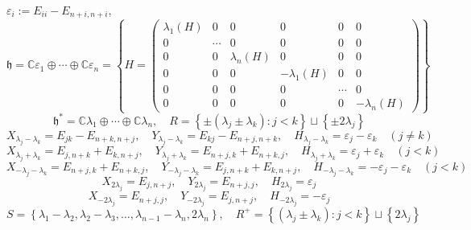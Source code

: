 \documentclass[reqno]{amsart} 
\def\eps{\varepsilon}
\begin{document}
$\eps_i := E_{i i} - E_{n+i,n+i}$,
\begin{equation*}
  \mathfrak{h} = \mathbb{C} \eps_1 \oplus \dotsb \oplus \mathbb{C} \eps_n = \left\{ H = 
\begin{pmatrix}
    \lambda_1(H) & 0 & 0 & 0 & 0 & 0 \\
    0 & \dotsb & 0 & 0 & 0 & 0 \\
    0 & 0 & \lambda_n(H) & 0 & 0 & 0 \\
    0 & 0 & 0 & -\lambda_1(H) & 0 & 0\\
    0 & 0 & 0 & 0 & \dotsb & 0 \\
    0 & 0 & 0 & 0 & 0 & -\lambda_n(H)
  \end{pmatrix}
\right\}
\end{equation*}
\begin{equation*}
  \mathfrak{h}^* = \mathbb{C} \lambda_1 \oplus \dotsb \oplus \mathbb{C} \lambda_n, \quad R = \left\{ \pm (\lambda_j \pm \lambda_k) : j < k \right\} \sqcup \left\{ \pm 2 \lambda_j \right\}
\end{equation*}
\begin{equation*}
  X_{\lambda_j - \lambda_k} = E_{j k} - E_{n+k,n+j}, \quad Y_{\lambda_j - \lambda_k} = E_{k j} - E_{n+j,n+k}, \quad H_{\lambda_j - \lambda_k} = \eps_j - \eps_k \quad (j \neq k)
\end{equation*}
\begin{equation*}
  X_{\lambda_j + \lambda_k} = E_{j,n+k} + E_{k,n+j}, \quad Y_{\lambda_j + \lambda_k} = E_{n+j, k} + E_{n+k,j}, \quad H_{\lambda_j + \lambda_k} = \eps_j + \eps_k \quad (j < k)
\end{equation*}
\begin{equation*}
  X_{-\lambda_j - \lambda_k} = E_{n+j,k} + E_{n+k,j}, \quad Y_{-\lambda_j - \lambda_k} = E_{j, n+k} + E_{k,n+j}, \quad H_{-\lambda_j - \lambda_k} = -\eps_j - \eps_k \quad (j < k)
\end{equation*}
\begin{equation*}
  X_{2 \lambda_j} = E_{j,n+j}, \quad Y_{2 \lambda_j} = E_{n+j,j}, \quad H_{2 \lambda_j} = \eps_j
\end{equation*}
\begin{equation*}
  X_{-2 \lambda_j} = E_{n+j,j}, \quad Y_{-2 \lambda_j} = E_{j,n+j}, \quad H_{-2 \lambda_j} = -\eps_j
\end{equation*}
\begin{equation*}
  S = \left\{ \lambda_1 - \lambda_2, \lambda_2 - \lambda_3, \dotsc, \lambda_{n-1} - \lambda_n, 2 \lambda_n \right\}, \quad R^+ = \left\{ (\lambda_j \pm \lambda_k) : j < k \right\} \sqcup \left\{ 2 \lambda_j \right\}
\end{equation*}
\end{document}
